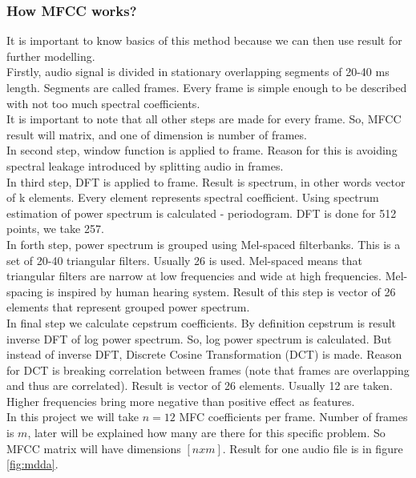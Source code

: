 \documentclass{article}
\begin{document}
\subsubsection{How MFCC works?}
It is important to know basics of this method because we can then use result for further modelling.\\
Firstly, audio signal is divided in stationary overlapping segments of 20-40 ms length. Segments are called frames.
Every frame is simple enough to be described with not too much spectral coefficients.\\
It is important to note that all other steps are made for every frame. So, MFCC result will matrix, and one of 
dimension is number of frames.\\
In second step, window function is applied to frame. Reason for this is avoiding spectral leakage introduced by
splitting audio in frames.\\
In third step, DFT is applied to frame. Result is spectrum, in other words vector of k elements. Every element 
represents spectral coefficient. Using spectrum estimation of power spectrum is calculated - periodogram. DFT is 
done for 512 points, we take 257.\\
In forth step, power spectrum is grouped using Mel-spaced filterbanks. This is a set of 20-40 triangular filters.
Usually 26 is used. Mel-spaced means that triangular filters are narrow at low frequencies and wide at high 
frequencies. Mel-spacing is inspired by human hearing system. Result of this step is vector of 26 elements that
represent grouped power spectrum.\\
In final step we calculate cepstrum coefficients. By definition cepstrum is result inverse DFT of log power spectrum.
So, log power spectrum is calculated. But instead of inverse DFT, Discrete Cosine Transformation (DCT) is made. 
Reason for DCT is breaking correlation between frames (note that frames are overlapping and thus are correlated).
Result is vector of 26 elements. Usually 12 are taken. Higher frequencies bring more negative than positive effect
as features.\\
In this project we will take $n=12$ MFC coefficients per frame. Number of frames is $m$, later will be explained how 
many are there for this specific problem. So MFCC matrix will have dimensions $[n x m]$. Result for one audio 
file is in figure \ref{fig:mdda}. \\
\end{document}
